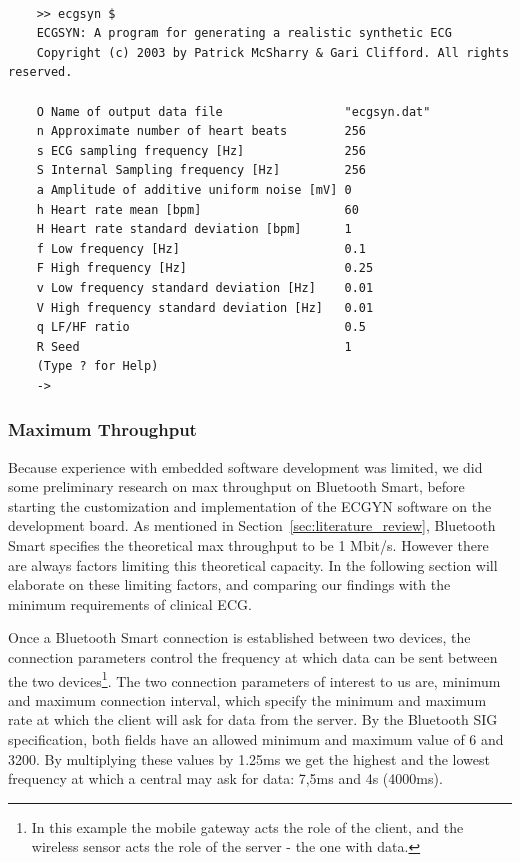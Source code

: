 \begin{lstlisting}[caption={ECGSYN Commando Line Interface (CLI)}, label={lst:ecgsyn:terminal}, basicstyle=\small]

    >> ecgsyn $
    ECGSYN: A program for generating a realistic synthetic ECG
    Copyright (c) 2003 by Patrick McSharry & Gari Clifford. All rights reserved.
     
    O Name of output data file                 "ecgsyn.dat"
    n Approximate number of heart beats        256
    s ECG sampling frequency [Hz]              256
    S Internal Sampling frequency [Hz]         256
    a Amplitude of additive uniform noise [mV] 0
    h Heart rate mean [bpm]                    60
    H Heart rate standard deviation [bpm]      1
    f Low frequency [Hz]                       0.1
    F High frequency [Hz]                      0.25
    v Low frequency standard deviation [Hz]    0.01
    V High frequency standard deviation [Hz]   0.01
    q LF/HF ratio                              0.5
    R Seed                                     1
    (Type ? for Help)
    ->

\end{lstlisting}

\subsubsection{Maximum Throughput} %
\label{ssub:maximum_throughput}

Because experience with embedded software development was limited, we did some preliminary research on max throughput on Bluetooth Smart, before starting the customization and implementation of the ECGYN software on the development board. As mentioned in Section~\ref{sec:literature_review}, Bluetooth Smart specifies the theoretical max throughput to be 1 Mbit/s. However there are always factors limiting this theoretical capacity. In the following section will elaborate on these limiting factors, and comparing our findings with the minimum requirements of clinical ECG.

Once a Bluetooth Smart connection is established between two devices, the connection parameters \cite{newRef:59} control the frequency at which data can be sent between the two devices\footnote{ In this example the mobile gateway acts the role of the client, and the wireless sensor acts the role of the server - the one with data.}. The two connection parameters of interest to us are, minimum and maximum connection interval, which specify the minimum and maximum rate at which the client will ask for data from the server. By the Bluetooth SIG specification, both fields have an allowed minimum and maximum value of 6 and 3200. By multiplying these values by 1.25ms we get the highest and the lowest frequency at which a central may ask for data: 7,5ms and 4s (4000ms).

